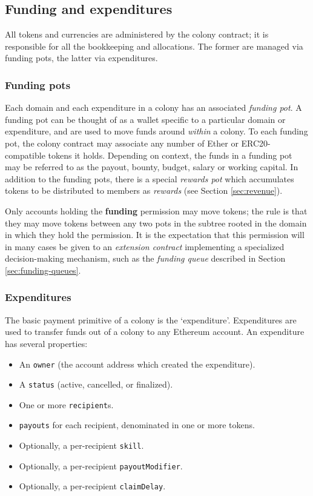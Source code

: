 \subsection{Funding and expenditures}\label{sec:expenditures}\label{sec:finance}

All tokens and currencies are administered by the colony contract; it is responsible for all the bookkeeping and allocations. The former are managed via funding pots, the latter via expenditures.

\subsubsection{Funding pots}

Each domain and each expenditure in a colony has an associated \emph{funding pot}. A funding pot can be thought of as a wallet specific to a particular domain or expenditure, and are used to move funds around \textit{within} a colony. To each funding pot, the colony contract may associate any number of Ether or ERC20-compatible tokens it holds. Depending on context, the funds in a funding pot may be referred to as the payout, bounty, budget, salary or working capital. In addition to the funding pots, there is a special \emph{rewards pot} which accumulates tokens to be distributed to members as \textit{rewards} (see Section \ref{sec:revenue}).

Only accounts holding the \textbf{funding} permission may move tokens; the rule is that they may move tokens between any two pots in the subtree rooted in the domain in which they hold the permission. It is the expectation that this permission will in many cases be given to an \textit{extension contract} implementing a specialized decision-making mechanism, such as the \textit{funding queue} described in Section \ref{sec:funding-queues}.

\subsubsection{Expenditures}

The basic payment primitive of a colony is the `expenditure'. Expenditures are used to transfer funds out of a colony to any Ethereum account. An expenditure has several properties:

\begin{itemize}
\item An \texttt{owner} (the account address which created the expenditure).
\item A \texttt{status} (active, cancelled, or finalized).
\item One or more \texttt{recipient}s.
\item \texttt{payouts} for each recipient, denominated in one or more tokens.
\item Optionally, a per-recipient \texttt{skill}.
\item Optionally, a per-recipient \texttt{payoutModifier}.
\item Optionally, a per-recipient \texttt{claimDelay}.
\end{itemize}

